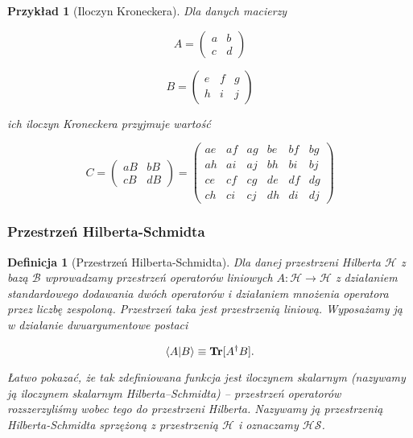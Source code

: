 \documentclass[a4paper,12pt]{article}
\newtheorem{definition}{Definicja}
\newtheorem{example}{Przykład}
\begin{document}
\begin{example}[Iloczyn Kroneckera]
    Dla danych macierzy

    $$
        A =
        \begin{pmatrix}
            a & b \\
            c & d
        \end{pmatrix}
    $$

    $$
        B =
        \begin{pmatrix}
            e & f & g \\
            h & i & j
        \end{pmatrix}
    $$

    ich iloczyn Kroneckera przyjmuje wartość

    $$
        C =
        \begin{pmatrix}
            a B & b B \\
            c B & d B
        \end{pmatrix}
        =
        \begin{pmatrix}
            a e & a f & a g & b e & b f & b g \\
            a h & a i & a j & b h & b i & b j \\
            c e & c f & c g & d e & d f & d g \\
            c h & c i & c j & d h & d i & d j
        \end{pmatrix}
    $$
\end{example}

\subsubsection{Przestrzeń Hilberta-Schmidta}

\begin{definition}[Przestrzeń Hilberta-Schmidta]
    Dla danej przestrzeni Hilberta $\mathcal{H}$ z bazą $\mathcal{B}$ wprowadzamy przestrzeń operatorów liniowych $A: \mathcal{H} \rightarrow \mathcal{H}$ z działaniem standardowego dodawania dwóch operatorów i działaniem mnożenia operatora przez liczbę zespoloną. Przestrzeń taka jest przestrzenią liniową. Wyposażamy ją w działanie dwuargumentowe postaci

    $$
        \bra{A}\ket{B} \equiv \textbf{Tr}[A ^ {\dag} B].
    $$

    Łatwo pokazać, że tak zdefiniowana funkcja jest iloczynem skalarnym (nazywamy ją iloczynem skalarnym Hilberta--Schmidta) -- przestrzeń operatorów rozszerzyliśmy wobec tego do przestrzeni Hilberta. Nazywamy ją przestrzenią Hilberta-Schmidta sprzężoną z przestrzenią $\mathcal{H}$ i oznaczamy $\mathcal{HS}$.
\end{definition}
\end{document}
